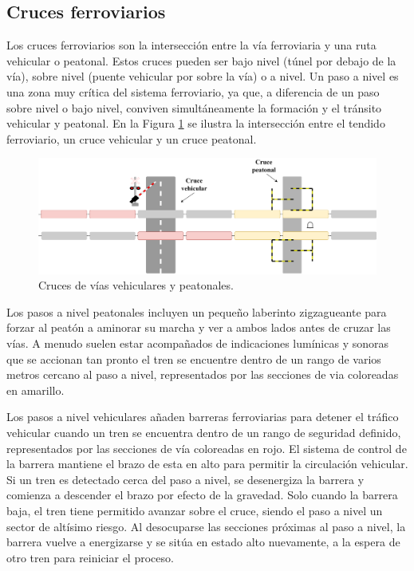 \subsection{Cruces ferroviarios}
    \label{sec:crossing}
    
    Los cruces ferroviarios son la intersección entre la vía ferroviaria y una ruta vehicular o peatonal. Estos cruces pueden ser bajo nivel (túnel por debajo de la vía), sobre nivel (puente vehicular por sobre la vía) o a nivel. Un paso a nivel es una zona muy crítica del sistema ferroviario, ya que, a diferencia de un paso sobre nivel o bajo nivel, conviven simultáneamente la formación y el tránsito vehicular y peatonal. En la Figura \ref{fig:cruce_1} se ilustra la intersección entre el tendido ferroviario, un cruce vehicular y un cruce peatonal.
    
        \begin{figure}[H]
            \centering
            \includegraphics[width=1\textwidth]{Figuras/cruce}
            \centering\caption{Cruces de vías vehiculares y peatonales.}
            \label{fig:cruce_1}
        \end{figure}
        
    Los pasos a nivel peatonales incluyen un pequeño laberinto zigzagueante para forzar al peatón a aminorar su marcha y ver a ambos lados antes de cruzar las vías. A menudo suelen estar acompañados de indicaciones lumínicas y sonoras que se accionan tan pronto el tren se encuentre dentro de un rango de varios metros cercano al paso a nivel, representados por las secciones de via coloreadas en amarillo.
    
    Los pasos a nivel vehiculares añaden barreras ferroviarias para detener el tráfico vehicular cuando un tren se encuentra dentro de un rango de seguridad definido, representados por las secciones de vía coloreadas en rojo.  El sistema de control de la barrera mantiene el brazo de esta en alto para permitir la circulación vehicular. Si un tren es detectado cerca del paso a nivel, se desenergiza la barrera y comienza a descender el brazo por efecto de la gravedad. Solo cuando la barrera baja, el tren tiene permitido avanzar sobre el cruce, siendo el paso a nivel un sector de altísimo riesgo. Al desocuparse las secciones próximas al paso a nivel, la barrera vuelve a energizarse y se sitúa en estado alto nuevamente, a la espera de otro tren para reiniciar el proceso. 
    
